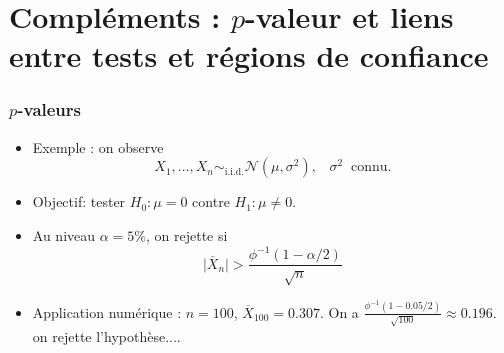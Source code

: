 

\section{Compléments : $p$-valeur et liens entre tests et régions de confiance}

\begin{frame}
\frametitle{$p$-valeurs}
\begin{itemize}
\item \alert{Exemple} : on observe
$$X_1,\ldots, X_n\sim_{\text{i.i.d.}}{\mathcal N}(\mu,\sigma^2),\;\;\;\sigma^2\;\;\text{connu}.$$
\item \alert{Objectif}: tester $H_0:\mu=0$ contre $H_1:\mu\neq 0$.
\item Au niveau $\alpha=5\%$, on rejette si
$$\big| \overline{X}_n \big| > \frac{\phi^{-1}(1-\alpha/2)}{\sqrt{n}}$$
\item \alert{Application numérique} : $n=100$, $\overline{X}_{100}=0.307$. On a $\frac{\phi^{-1}(1-0.05/2)}{\sqrt{100}} \approx 0.196$. \alert{on rejette l'hypothèse...}.
\end{itemize}
\end{frame}

